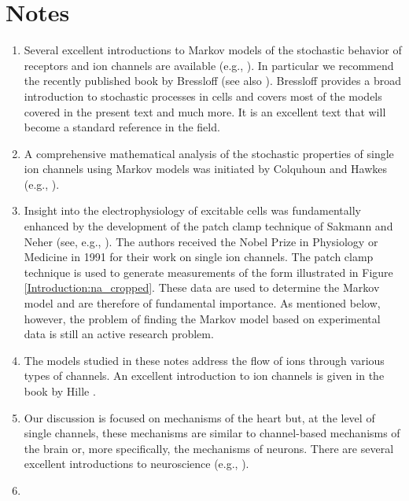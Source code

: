 \section{Notes}
\begin{enumerate}
\item Several excellent introductions to Markov models of the stochastic behavior of receptors and ion channels are available (e.g., \cite{KeenerSneyd, Smith2002, Jacobs2010, Santillan2014}). In particular we recommend the recently published book by Bressloff \cite{Bressloff2014} (see also \cite{Bressloff2014w}). Bressloff \cite{Bressloff2014} provides a broad introduction to stochastic processes in cells and covers most of the models covered in the present text and much more. It is an excellent text that will become a standard reference in the field.
\item A comprehensive mathematical analysis of the stochastic properties of single ion channels using Markov models was initiated by Colquhoun and Hawkes (e.g., \cite{ Colquhoun1977,Colquhoun1981,Colquhoun1982}).
\item Insight into the electrophysiology of excitable cells was fundamentally enhanced by the development of the patch clamp technique of Sakmann and Neher (see, e.g., \cite{Sakmann1984,Sakmann1995}). The authors received the Nobel Prize in Physiology or Medicine in 1991 for their work on single ion channels. The patch clamp technique is used to generate measurements of the form illustrated in
Figure \ref{Introduction:na_cropped}. These data are used to determine the Markov model and are therefore of fundamental importance. As mentioned below, however, the problem of finding the Markov model based on experimental data is still an active research problem.
\item The models studied in these notes address the flow of ions through various types of channels. An excellent introduction to ion channels is given in the book by Hille \cite{Hille2001}.
\item Our discussion is focused on mechanisms of the heart but, at the level of single channels, these mechanisms are similar to channel-based mechanisms of the brain or, more specifically, the mechanisms of neurons. There are several excellent introductions to neuroscience
(e.g., \cite{Ermentrout2010,Sterratt2011,Dayan2001,Izhikevich2007}).
\item

\end{enumerate}

